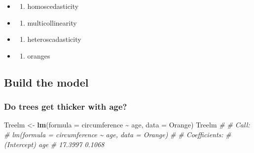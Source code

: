 \documentclass[
]{book}
\newenvironment{Shaded}{\begin{snugshade}}{\end{snugshade}}
\newcommand{\AttributeTok}[1]{\textcolor[rgb]{0.13,0.29,0.53}{#1}}
\newcommand{\CommentTok}[1]{\textcolor[rgb]{0.56,0.35,0.01}{\textit{#1}}}
\newcommand{\FunctionTok}[1]{\textcolor[rgb]{0.13,0.29,0.53}{\textbf{#1}}}
\newcommand{\NormalTok}[1]{#1}
\newcommand{\OtherTok}[1]{\textcolor[rgb]{0.56,0.35,0.01}{#1}}
\newcommand{\SpecialCharTok}[1]{\textcolor[rgb]{0.81,0.36,0.00}{\textbf{#1}}}
\providecommand{\tightlist}{%
  \setlength{\itemsep}{0pt}\setlength{\parskip}{0pt}}
\begin{document}
\begin{itemize}
\tightlist
\item
  \begin{enumerate}
  \def\labelenumi{(\Alph{enumi})}
  \tightlist
  \item
    homoscedasticity\\
  \end{enumerate}
\item
  \begin{enumerate}
  \def\labelenumi{(\Alph{enumi})}
  \setcounter{enumi}{1}
  \tightlist
  \item
    multicollinearity\\
  \end{enumerate}
\item
  \begin{enumerate}
  \def\labelenumi{(\Alph{enumi})}
  \setcounter{enumi}{2}
  \tightlist
  \item
    heteroscadasticity\\
  \end{enumerate}
\item
  \begin{enumerate}
  \def\labelenumi{(\Alph{enumi})}
  \setcounter{enumi}{3}
  \tightlist
  \item
    oranges
  \end{enumerate}
\end{itemize}

\subsection{Build the model}\label{build-the-model-1}

\subsubsection{Do trees get thicker with age?}\label{do-trees-get-thicker-with-age}

\begin{Shaded}
\begin{Highlighting}[]
\NormalTok{Treelm }\OtherTok{\textless{}{-}} \FunctionTok{lm}\NormalTok{(}\AttributeTok{formula =}\NormalTok{ circumference }\SpecialCharTok{\textasciitilde{}}\NormalTok{ age, }\AttributeTok{data =}\NormalTok{ Orange)}
\NormalTok{Treelm}
\CommentTok{\# }
\CommentTok{\# Call:}
\CommentTok{\# lm(formula = circumference \textasciitilde{} age, data = Orange)}
\CommentTok{\# }
\CommentTok{\# Coefficients:}
\CommentTok{\# (Intercept)          age  }
\CommentTok{\#     17.3997       0.1068}
\end{Highlighting}
\end{Shaded}
\end{document}
